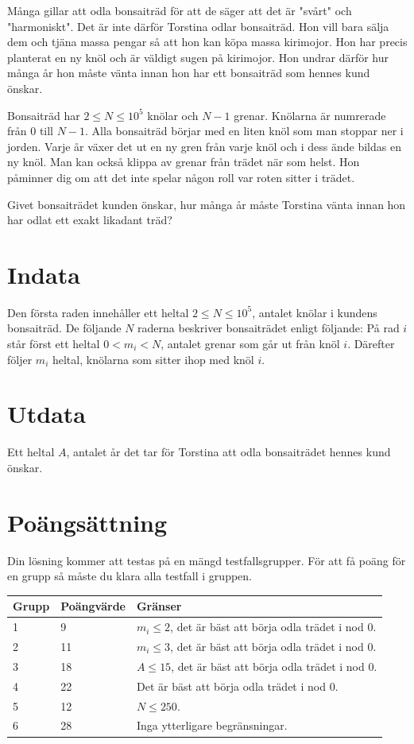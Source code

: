 Många gillar att odla bonsaiträd för att de säger att det är "svårt" och "harmoniskt". Det är inte därför Torstina odlar bonsaiträd. Hon vill bara sälja dem och tjäna massa pengar så att hon kan köpa massa kirimojor. Hon har precis planterat en ny knöl och är väldigt sugen på kirimojor. Hon undrar därför hur många år hon måste vänta innan hon har ett bonsaiträd som hennes kund önskar.

Bonsaiträd har $2\leq N \leq 10^5$ knölar och $N-1$ grenar. Knölarna är numrerade från 0 till $N-1$. Alla bonsaiträd börjar med en liten knöl som man stoppar ner i jorden. Varje år växer det ut en ny gren från varje knöl och i dess ände bildas en ny knöl. Man kan också klippa av grenar från trädet när som helst. Hon påminner dig om att det inte spelar någon roll var roten sitter i trädet. 

Givet bonsaiträdet kunden önskar, hur många år måste Torstina vänta innan hon har odlat ett exakt likadant träd?

\section*{Indata}
Den första raden innehåller ett heltal $2 \leq N \leq 10^5$, antalet knölar i kundens bonsaiträd.
De följande $N$ raderna beskriver bonsaiträdet enligt följande:
På rad $i$ står först ett heltal $0 < m_i < N$, antalet grenar som går ut från knöl $i$. Därefter följer $m_i$ heltal, knölarna som sitter ihop med knöl $i$. 

\section*{Utdata}
Ett heltal $A$, antalet år det tar för Torstina att odla bonsaiträdet hennes kund önskar.

\section*{Poängsättning}
Din lösning kommer att testas på en mängd testfallsgrupper.
För att få poäng för en grupp så måste du klara alla testfall i gruppen.

\noindent
\begin{tabular}{| l | l | l |}
\hline
Grupp & Poängvärde & Gränser \\ \hline
1     & 9        &  $m_i\leq 2$, det är bäst att börja odla trädet i nod 0.\\ \hline
2     & 11         &  $m_i \leq 3$, det är bäst att börja odla trädet i nod 0. \\ \hline
3     & 18         & $A \leq 15$, det är bäst att börja odla trädet i nod 0. \\ \hline
4     & 22          & Det är bäst att börja odla trädet i nod 0. \\ \hline
5     & 12          &  $N \leq 250$. \\ \hline
6     & 28          &  Inga ytterligare begränsningar. \\ \hline
\end{tabular}

